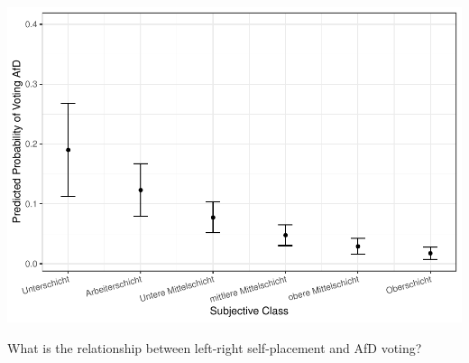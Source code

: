 \documentclass[
]{article}
\begin{document}
\includegraphics{AVCD_Final_Assignment-Edenhofer_latest_files/figure-latex/afd-subjective-class-1.pdf}

What is the relationship between left-right self-placement and AfD
voting?
\end{document}
